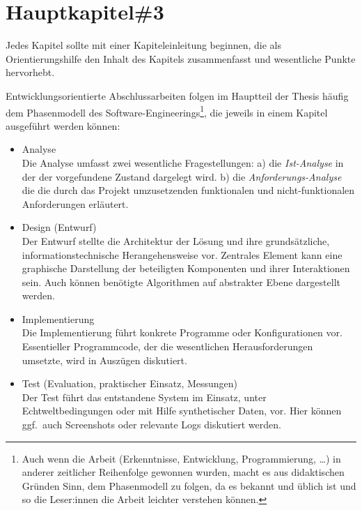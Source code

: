 \chapter{Hauptkapitel\#3}

Jedes Kapitel sollte mit einer Kapiteleinleitung beginnen, die als Orientierungshilfe den Inhalt des Kapitels zusammenfasst und wesentliche Punkte hervorhebt.

Entwicklungsorientierte Abschlussarbeiten folgen im Hauptteil der Thesis häufig dem Phasenmodell des Software-Engineerings\footnote{Auch wenn die Arbeit (Erkenntnisse, Entwicklung, Programmierung, \ldots) in anderer
zeitlicher Reihenfolge gewonnen wurden, macht es aus didaktischen Gründen Sinn, dem Phasenmodell zu folgen, da es bekannt und üblich ist und so die Leser:innen die Arbeit leichter verstehen können.}, die jeweils in einem Kapitel ausgeführt werden können:
\begin{itemize}\setlength{\parskip}{1ex}

\item Analyse\\
Die Analyse umfasst zwei wesentliche Fragestellungen: a) die \emph{Ist-Analyse} in der der vorgefundene Zustand dargelegt wird. b) die \emph{Anforderungs-Analyse} die die durch das Projekt umzusetzenden 
funktionalen und nicht-funktionalen Anforderungen erläutert.

\item Design (Entwurf)\\
Der Entwurf stellte die Architektur der Lösung und ihre grundsätzliche, informationstechnische Herangehensweise vor. 
Zentrales Element kann eine graphische Darstellung der beteiligten Komponenten und ihrer Interaktionen sein. Auch können benötigte Algorithmen auf abstrakter Ebene dargestellt werden.

\item Implementierung\\
Die Implementierung führt konkrete Programme oder Konfigurationen vor. Essentieller Programmcode, der die wesentlichen Herausforderungen umsetzte, wird in Auszügen diskutiert.

\item Test (Evaluation, praktischer Einsatz, Messungen)\\
Der Test führt das entstandene System im Einsatz, unter Echtweltbedingungen oder mit Hilfe synthetischer Daten, vor. Hier können ggf.\ auch Screenshots oder relevante Logs diskutiert werden.
\end{itemize}

